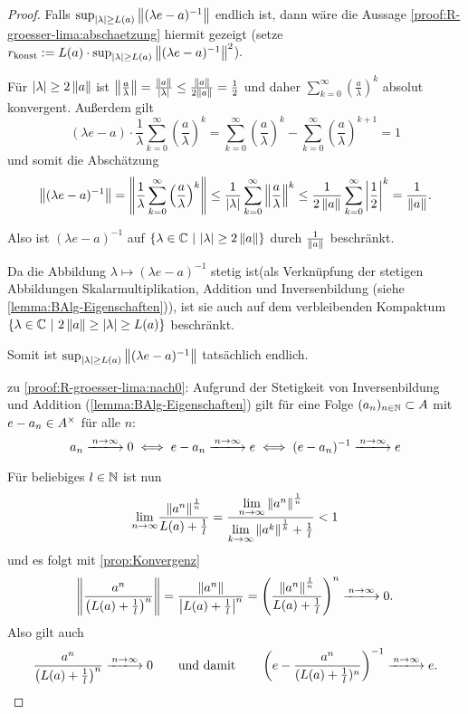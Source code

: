 \begin{proof}
Falls $\sup_{|\lambda| \geq L(a)}\left\lVert(\lambda e - a)^{-1}\right\rVert$ endlich ist, dann wäre die Aussage \ref{proof:R-groesser-lima:abschaetzung} hiermit gezeigt (setze $r_\textup{konst} := L(a) \cdot \sup_{|\lambda| \geq L(a)}\left\lVert(\lambda e - a)^{-1}\right\rVert^2$).

Für $|\lambda| \geq 2\left\lVert a\right\rVert$ ist $\left\lVert\frac{a}{\lambda}\right\rVert = \frac{\left\lVert a\right\rVert}{|\lambda|} \leq \frac{\left\lVert a\right\rVert}{2\left\lVert a\right\rVert} = \frac{1}{2}$ und daher $\sum_{k=0}^\infty \left(\frac{a}{\lambda}\right)^k$ absolut konvergent. Außerdem gilt
	\[(\lambda e - a)\cdot \frac{1}{\lambda}\sum_{k=0}^\infty \left(\frac{a}{\lambda}\right)^k = \sum_{k=0}^\infty \left(\frac{a}{\lambda}\right)^k - \sum_{k=0}^\infty \left(\frac{a}{\lambda}\right)^{k+1} = 1\]
und somit die Abschätzung
	\[\left\lVert(\lambda e - a)^{-1}\right\rVert = \left\lVert\frac{1}{\lambda}\sum_{k=0}^\infty \left(\frac{a}{\lambda}\right)^k\right\rVert \leq \frac{1}{|\lambda|}\sum_{k=0}^\infty\left\lVert\frac{a}{\lambda}\right\rVert^k \leq \frac{1}{2\left\lVert a\right\rVert}\sum_{k=0}^\infty\left|\frac{1}{2}\right|^k = \frac{1}{\left\lVert a\right\rVert}. \]

Also ist $(\lambda e - a)^{-1}$ auf $\{\lambda \in \mathbb{C} ~|~ |\lambda| \geq 2\left\lVert a\right\rVert\}$ durch $\frac{1}{\left\lVert a\right\rVert}$ beschränkt.

Da die Abbildung $\lambda \mapsto (\lambda e - a)^{-1}$ stetig ist(als Verknüpfung der stetigen Abbildungen Skalarmultiplikation, Addition und Inversenbildung (siehe \cref{lemma:BAlg-Eigenschaften})), ist sie auch auf dem verbleibenden Kompaktum $\{\lambda \in \mathbb{C} ~|~ 2\left\lVert a\right\rVert \geq |\lambda| \geq L(a)\}$ beschränkt. 

Somit ist $\sup_{|\lambda| \geq L(a)}\left\lVert(\lambda e - a)^{-1}\right\rVert$ tatsächlich endlich.


zu \ref{proof:R-groesser-lima:nach0}:
Aufgrund der Stetigkeit von Inversenbildung und Addition (\cref{lemma:BAlg-Eigenschaften}) gilt für eine Folge $(a_n)_{n\in\mathbb{N}} \subset A$ mit $e - a_n \in A^\times$ für alle $n$:
	\[a_n \xlongrightarrow{n\to\infty} 0 \iff e - a_n  \xlongrightarrow{n\to\infty} e \iff (e-a_n)^{-1} \xlongrightarrow{n\to\infty} e\]

Für beliebiges $l \in \mathbb{N}$ ist nun 
	\[\underset{n\to \infty}{\lim}\frac{\left\lVert a^n\right\rVert^\frac{1}{n}}{L(a)+\frac{1}{l}} = \frac{\underset{n\to \infty}{\lim}\left\lVert a^n\right\rVert^\frac{1}{n}}{\underset{k\to\infty}{\lim}\left\lVert a^k\right\rVert^\frac{1}{k}+\frac{1}{l}} < 1\]
und es folgt mit \cref{prop:Konvergenz}
	\[\norm{\frac{a^n}{\left(\lima+\frac{1}{l}\right)^n}} = \frac{\norm{a^n}}{\left|\lima+\frac{1}{l}\right|^n} = \left(\frac{\norm{a^n}^\frac{1}{n}}{\lima+\frac{1}{l}}\right)^n \xlongrightarrow{n\to\infty} 0.\]
Also gilt auch
	\[\frac{a^n}{\left(\lima+\frac{1}{l}\right)^n} \xlongrightarrow{n\to\infty} 0 \qquad \text{und damit} \qquad \left(e - \frac{a^n}{(\lima+\frac{1}{l})^n}\right)^{-1} \xlongrightarrow{n\to\infty} e.\]


\end{proof}
